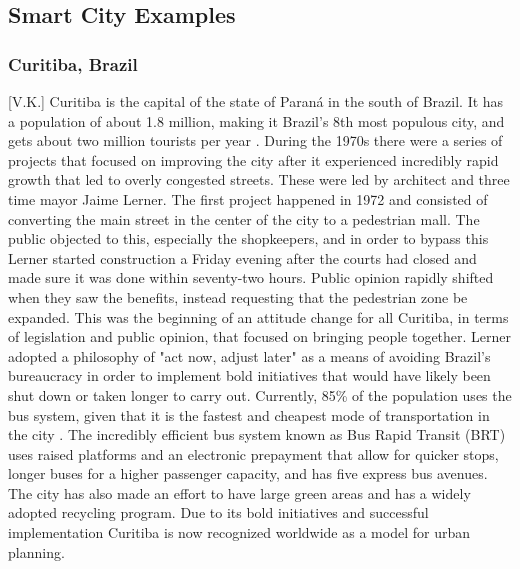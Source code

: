 \documentclass[12pt]{article}                       %
\begin{document}
\subsection{Smart City Examples}
\subsubsection{Curitiba, Brazil}[V.K.]
Curitiba is the capital of the state of Paraná in the south of Brazil. It has a population of about 1.8 million, making it Brazil's 8th most populous city, and gets about two million tourists per year \cite{Adler2016StoryCapital}. During the 1970s there were a series of projects that focused on improving the city after it experienced incredibly rapid growth that led to overly congested streets. These were led by architect and three time mayor Jaime Lerner. The first project happened in 1972 and consisted of converting the main street in the center of the city to a pedestrian mall. The public objected to this, especially the shopkeepers, and in order to bypass this Lerner started construction a Friday evening after the courts had closed and made sure it was done within seventy-two hours. Public opinion rapidly shifted when they saw the benefits, instead requesting that the pedestrian zone be expanded. This was the beginning of an attitude change for all Curitiba, in terms of legislation and public opinion, that focused on bringing people together. Lerner adopted a philosophy of "act now, adjust later" as a means of avoiding Brazil's bureaucracy in order to implement bold initiatives that would have likely been shut down or taken longer to carry out. Currently, 85\% of the population uses the bus system, given that it is the fastest and cheapest mode of transportation in the city \cite{Adler2016StoryCapital}. The incredibly efficient bus system known as Bus Rapid Transit (BRT) uses raised platforms and an electronic prepayment that allow for quicker stops, longer buses for a higher passenger capacity, and has five express bus avenues. The city has also made an effort to have large green areas and has a widely adopted recycling program. Due to its bold initiatives and successful implementation Curitiba is now recognized worldwide as a model for urban planning. 
\end{document}
